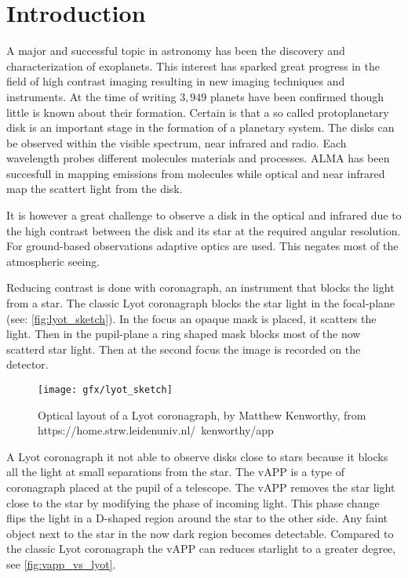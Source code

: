 
\chapter{Introduction} %

\label{ch:intro} %


A major and successful topic in astronomy has been the discovery and characterization of exoplanets. This interest has sparked great progress in the field of high contrast imaging resulting in new imaging techniques and instruments. At the time of writing $3,949$ planets have been confirmed though little is known about their formation. Certain is that a so called protoplanetary disk is an important stage in the formation of a planetary system. The disks can be observed within the visible spectrum, near infrared and radio. Each wavelength probes different molecules materials and processes. ALMA has been succesfull in mapping emissions from molecules while optical and near infrared map the scattert light from the disk.

It is however a great challenge to observe a disk in the optical and infrared due to the high contrast between the disk and its star at the required angular resolution. For ground-based observations adaptive optics are used. This negates most of the atmospheric seeing.

Reducing contrast is done with coronagraph, an instrument that blocks the light from a star. The classic Lyot coronagraph blocks the star light in the focal-plane (see: \autoref{fig:lyot_sketch}). In the focus an opaque mask is placed, it scatters the light. Then in the pupil-plane a ring shaped mask blocks most of the now scatterd star light. Then at the second focus the image is recorded on the detector.

\begin{figure}
    \texttt{[image: gfx/lyot\_sketch]}
    \caption{Optical layout of a Lyot coronagraph, by Matthew Kenworthy, from https://home.strw.leidenuniv.nl/~kenworthy/app}
    \label{fig:lyot_sketch}
\end {figure}

A Lyot coronagraph it not able to observe disks close to stars because it blocks all the light at small separations from the star. The \ac{vAPP} \cite{vapp_snik} is a type of coronagraph placed at the pupil of a telescope. The \ac{vAPP} removes the star light close to the star by modifying the phase of incoming light. This phase change flips the light in a D-shaped region around the star to the other side. Any faint object next to the star in the now dark region becomes detectable. Compared to the classic Lyot coronagraph the \ac{vAPP} can reduces starlight to a greater degree, see \autoref{fig:vapp_vs_lyot}.  

